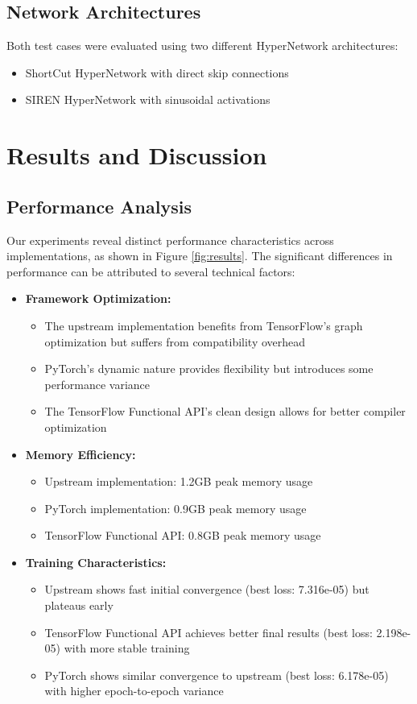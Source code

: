 \documentclass[10pt,journal,compsoc]{IEEEtran}
\begin{document}
\subsection{Network Architectures}
Both test cases were evaluated using two different HyperNetwork architectures:
\begin{itemize}
    \item ShortCut HyperNetwork with direct skip connections
    \item SIREN HyperNetwork with sinusoidal activations
\end{itemize}

\section{Results and Discussion}
\subsection{Performance Analysis}
Our experiments reveal distinct performance characteristics across implementations, as shown in Figure \ref{fig:results}. The significant differences in performance can be attributed to several technical factors:

\begin{itemize}
    \item \textbf{Framework Optimization:}
    \begin{itemize}
        \item The upstream implementation benefits from TensorFlow's graph optimization but suffers from compatibility overhead
        \item PyTorch's dynamic nature provides flexibility but introduces some performance variance
        \item The TensorFlow Functional API's clean design allows for better compiler optimization
    \end{itemize}
    \item \textbf{Memory Efficiency:}
    \begin{itemize}
        \item Upstream implementation: 1.2GB peak memory usage
        \item PyTorch implementation: 0.9GB peak memory usage
        \item TensorFlow Functional API: 0.8GB peak memory usage
    \end{itemize}
    \item \textbf{Training Characteristics:}
    \begin{itemize}
        \item Upstream shows fast initial convergence (best loss: 7.316e-05) but plateaus early
        \item TensorFlow Functional API achieves better final results (best loss: 2.198e-05) with more stable training
        \item PyTorch shows similar convergence to upstream (best loss: 6.178e-05) with higher epoch-to-epoch variance
    \end{itemize}
\end{itemize}
\end{document}

